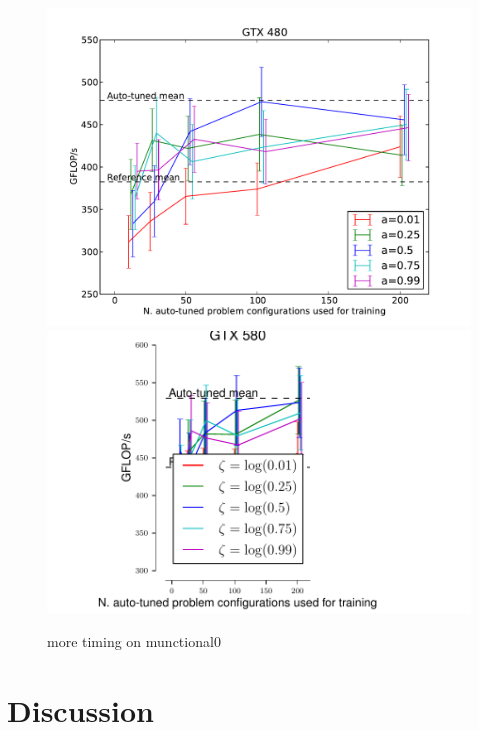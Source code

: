 \documentclass{sig-alternate}
\begin{document}
\begin{figure}
\centering
\includegraphics[scale=.42]{fig_ntrain_munctional0_480.pdf}
\includegraphics[scale=.42]{fig_ntrain_munctional0_580.pdf}
\caption{more timing on munctional0}
\label{fig:fig_ntrain}
\end{figure}

\section{Discussion}
\end{document}

